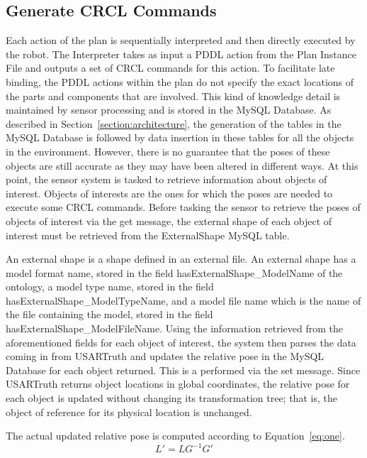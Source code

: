 \subsection{Generate CRCL Commands}
\label{subsection:CRCL}
Each action of the plan is sequentially interpreted and then directly executed by the robot. The \textsf{Interpreter} takes as input a PDDL action from the \textsf{Plan Instance File} and outputs a set of CRCL commands for this action. To facilitate late binding, the PDDL actions within the plan  do not specify the exact locations of the parts and components that are involved. This kind of knowledge detail is maintained by sensor processing and is stored in the \textsf{MySQL Database}. As described in Section~\ref{section:architecture}, the generation of the tables in the \textsf{MySQL Database} is followed by data insertion in these tables for all the objects in the environment. However, there is no guarantee that the poses of these objects are still accurate as they may have been altered in different ways. At this point, the sensor system is tasked to retrieve information about objects of interest. Objects of interests are the ones for which the poses are needed to execute some CRCL commands. Before tasking the sensor to retrieve the poses of objects of interest via the \textsf{get} message, the external shape of each object of interest must be retrieved from the \textsf{ExternalShape} MySQL table.

An external shape is a shape defined in an external file. An external shape has a model format name, stored in the field \textsf{hasExternalShape\_ModelName} of the ontology, a model type name, stored in the field \textsf{hasExternalShape\_ModelTypeName}, and a model file name which is the name of the file containing the model, stored in the field \textsf{hasExternalShape\_ModelFileName}. Using the information retrieved from the aforementioned fields for each object of interest, the system then parses the data coming in from USARTruth and updates the relative pose in the \textsf{MySQL Database} for each object returned. This is a performed via the \textsf{set} message. Since USARTruth returns object locations in global coordinates, the relative pose for each object is updated without changing its transformation tree; that is, the object of reference for its physical location is unchanged.


The actual updated relative pose is computed according to Equation~\ref{eq:one}.
 \begin{equation}
\label{eq:one}
 L' = LG^{-1}G'
 \end{equation}

